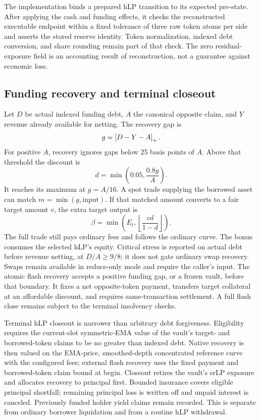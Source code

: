The implementation binds a prepared hLP transition to its expected pre-state. After applying the cash and funding effects, it checks the reconstructed executable endpoint within a fixed tolerance of three raw token atoms per side and asserts the stored reserve identity. Token normalization, indexed debt conversion, and share rounding remain part of that check. The zero residual-exposure field is an accounting result of reconstruction, not a guarantee against economic loss.

\subsection{Funding recovery and terminal closeout}

Let $D$ be actual indexed funding debt, $A$ the canonical opposite claim, and $Y$ revenue already available for netting. The recovery gap is
\begin{equation}
g=\left[D-Y-A\right]_+.
\end{equation}
For positive $A$, recovery ignores gaps below 25 basis points of $A$. Above that threshold the discount is
\begin{equation}
d=\min\left(0.05,\frac{0.8g}{A}\right).
\label{eq:discount}
\end{equation}
It reaches its maximum at $g=A/16$. A spot trade supplying the borrowed asset can match $m=\min(g,\text{input})$. If that matched amount converts to a fair target amount $v$, the extra target output is
\begin{equation}
\beta=\min\left(E_t,\left\lfloor\frac{vd}{1-d}\right\rfloor\right).
\label{eq:bonus}
\end{equation}
The full trade still pays ordinary fees and follows the ordinary curve. The bonus consumes the selected hLP's equity. Critical stress is reported on actual debt before revenue netting, at $D/A\ge9/8$; it does not gate ordinary swap recovery. Swaps remain available in reduce-only mode and require the caller's input. The atomic flash recovery accepts a positive funding gap, or a frozen vault, before that boundary. It fixes a net opposite-token payment, transfers target collateral at an affordable discount, and requires same-transaction settlement. A full flash close remains subject to the terminal insolvency checks.

Terminal hLP closeout is narrower than arbitrary debt forgiveness. Eligibility requires the current-slot symmetric-EMA value of the vault's target- and borrowed-token claims to be no greater than indexed debt. Native recovery is then valued on the EMA-price, smoothed-depth concentrated reference curve with the configured fees; external flash recovery uses the fixed payment and borrowed-token claim bound at begin. Closeout retires the vault's srLP exposure and allocates recovery to principal first. Bounded insurance covers eligible principal shortfall; remaining principal loss is written off and unpaid interest is canceled. Previously funded holder yield claims remain recorded. This is separate from ordinary borrower liquidation and from a routine hLP withdrawal.

